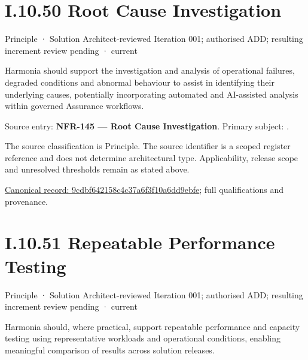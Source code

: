 \section*{I.10.50 Root Cause Investigation}
\label{navigation:I.10.50}

\label{element:9cdbf642158c4c37a6f3f10a6dd9ebfe}
{\small Principle · Solution Architect-reviewed Iteration 001; authorised ADD; resulting increment review pending · current}\par

Harmonia should support the investigation and analysis of operational failures, degraded conditions and abnormal behaviour to assist in identifying their underlying causes, potentially incorporating automated and AI-assisted analysis within governed Assurance workflows.



Source entry: \textbf{NFR-145 — Root Cause Investigation}. Primary subject: \texttt{}.



The source classification is Principle. The source identifier is a scoped register reference and does not determine architectural type. Applicability, release scope and unresolved thresholds remain as stated above.


{\footnotesize \href{../../../../../../../continuum/motivation/principle/9cdbf642158c4c37a6f3f10a6dd9ebfe.md}{Canonical record: 9cdbf642158c4c37a6f3f10a6dd9ebfe}; full qualifications and provenance.}\par
\section*{I.10.51 Repeatable Performance Testing}
\label{navigation:I.10.51}

\label{element:1c2eb4d9aef4425288528907fed7ebc2}
{\small Principle · Solution Architect-reviewed Iteration 001; authorised ADD; resulting increment review pending · current}\par

Harmonia should, where practical, support repeatable performance and capacity testing using representative workloads and operational conditions, enabling meaningful comparison of results across solution releases.



